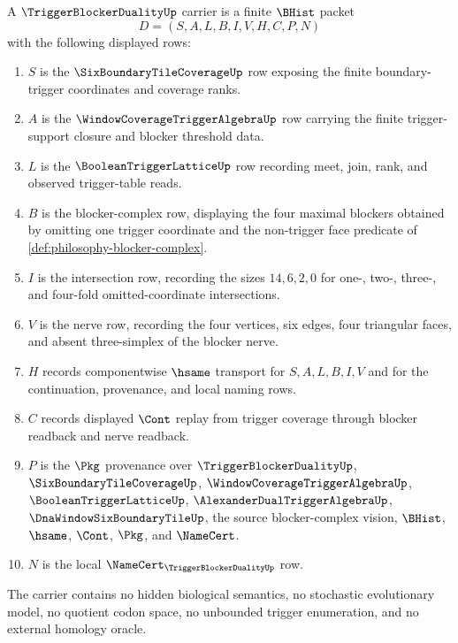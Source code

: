 \begin{definition}
\label{def:trigger-blocker-duality-carrier}
A $\TriggerBlockerDualityUp$ carrier is a finite $\BHist$ packet
$$
D=(S,A,L,B,I,V,H,C,P,N)
$$
with the following displayed rows:
\begin{enumerate}
\item $S$ is the $\SixBoundaryTileCoverageUp$ row exposing the finite boundary-trigger coordinates and coverage ranks.
\item $A$ is the $\WindowCoverageTriggerAlgebraUp$ row carrying the finite trigger-support closure and blocker threshold data.
\item $L$ is the $\BooleanTriggerLatticeUp$ row recording meet, join, rank, and observed trigger-table reads.
\item $B$ is the blocker-complex row, displaying the four maximal blockers obtained by omitting one trigger coordinate and the non-trigger face predicate of \autoref{def:philosophy-blocker-complex}.
\item $I$ is the intersection row, recording the sizes $14,6,2,0$ for one-, two-, three-, and four-fold omitted-coordinate intersections.
\item $V$ is the nerve row, recording the four vertices, six edges, four triangular faces, and absent three-simplex of the blocker nerve.
\item $H$ records componentwise $\hsame$ transport for $S,A,L,B,I,V$ and for the continuation, provenance, and local naming rows.
\item $C$ records displayed $\Cont$ replay from trigger coverage through blocker readback and nerve readback.
\item $P$ is the $\Pkg$ provenance over $\TriggerBlockerDualityUp$, $\SixBoundaryTileCoverageUp$, $\WindowCoverageTriggerAlgebraUp$, $\BooleanTriggerLatticeUp$, $\AlexanderDualTriggerAlgebraUp$, $\DnaWindowSixBoundaryTileUp$, the source blocker-complex vision, $\BHist$, $\hsame$, $\Cont$, $\Pkg$, and $\NameCert$.
\item $N$ is the local $\NameCert_{\TriggerBlockerDualityUp}$ row.
\end{enumerate}
The carrier contains no hidden biological semantics, no stochastic evolutionary model, no quotient codon space, no unbounded trigger enumeration, and no external homology oracle.
\end{definition}

